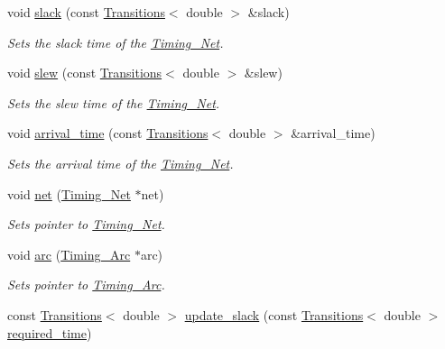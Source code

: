 \begin{DoxyCompactItemize}
\item 
void \hyperlink{classTiming__Analysis_1_1Timing__Point_a18a4b15b4612ea98ebba0f1f1e25db18}{slack} (const \hyperlink{classTransitions}{Transitions}$<$ double $>$ \&slack)
\begin{DoxyCompactList}\small\item\em Sets the slack time of the \hyperlink{classTiming__Analysis_1_1Timing__Net}{Timing\-\_\-\-Net}. \end{DoxyCompactList}\item 
void \hyperlink{classTiming__Analysis_1_1Timing__Point_ac8040357b9d6e8bc62d2958b4ffb4da4}{slew} (const \hyperlink{classTransitions}{Transitions}$<$ double $>$ \&slew)
\begin{DoxyCompactList}\small\item\em Sets the slew time of the \hyperlink{classTiming__Analysis_1_1Timing__Net}{Timing\-\_\-\-Net}. \end{DoxyCompactList}\item 
void \hyperlink{classTiming__Analysis_1_1Timing__Point_a28f687613d6d4d9ec544f6b90c8d16e6}{arrival\-\_\-time} (const \hyperlink{classTransitions}{Transitions}$<$ double $>$ \&arrival\-\_\-time)
\begin{DoxyCompactList}\small\item\em Sets the arrival time of the \hyperlink{classTiming__Analysis_1_1Timing__Net}{Timing\-\_\-\-Net}. \end{DoxyCompactList}\item 
void \hyperlink{classTiming__Analysis_1_1Timing__Point_ab17571917e751e2d9bdd8dc11404bb66}{net} (\hyperlink{classTiming__Analysis_1_1Timing__Net}{Timing\-\_\-\-Net} $\ast$net)
\begin{DoxyCompactList}\small\item\em Sets pointer to \hyperlink{classTiming__Analysis_1_1Timing__Net}{Timing\-\_\-\-Net}. \end{DoxyCompactList}\item 
void \hyperlink{classTiming__Analysis_1_1Timing__Point_a7db0f9baed61c0534e19c2009ac41db5}{arc} (\hyperlink{classTiming__Analysis_1_1Timing__Arc}{Timing\-\_\-\-Arc} $\ast$arc)
\begin{DoxyCompactList}\small\item\em Sets pointer to \hyperlink{classTiming__Analysis_1_1Timing__Arc}{Timing\-\_\-\-Arc}. \end{DoxyCompactList}\item 
const \hyperlink{classTransitions}{Transitions}$<$ double $>$ \hyperlink{classTiming__Analysis_1_1Timing__Point_a62c2af027f267f45294b593f880bfe2d}{update\-\_\-slack} (const \hyperlink{classTransitions}{Transitions}$<$ double $>$ \hyperlink{classTiming__Analysis_1_1Timing__Point_aab60710f64cbc89f7316515aaca8ea17}{required\-\_\-time})

\end{DoxyCompactItemize}
